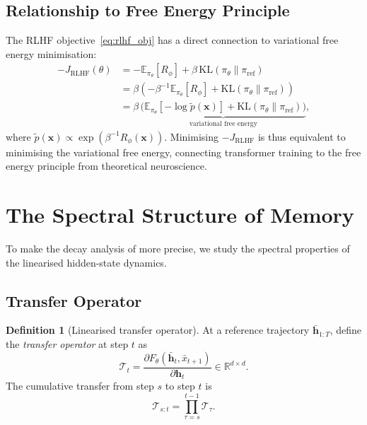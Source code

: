 \documentclass[11pt,a4paper]{article}
\theoremstyle{plain}
\theoremstyle{definition}
\newtheorem{definition}[theorem]{Definition}
\theoremstyle{remark}
\newcommand{\R}{\mathbb{R}}
\newcommand{\E}{\mathbb{E}}
\newcommand{\cT}{\mathcal{T}}
\newcommand{\KL}{\mathrm{KL}}
\begin{document}
\subsection{Relationship to Free Energy Principle}

The RLHF objective~\eqref{eq:rlhf_obj} has a direct connection to variational
free energy minimisation:
\begin{align}
  -J_{\mathrm{RLHF}}(\theta)
  &= -\E_{\pi_\theta}[R_\phi] + \beta\, \KL(\pi_\theta \| \pi_{\mathrm{ref}}) \\
  &= \beta\!\left(
       -\beta^{-1}\E_{\pi_\theta}[R_\phi]
       + \KL(\pi_\theta \| \pi_{\mathrm{ref}})
     \right) \\
  &= \beta\, \underbrace{\bigl(
       \E_{\pi_\theta}[-\log \tilde{p}(\bm{x})]
       + \KL(\pi_\theta \| \pi_{\mathrm{ref}})
     \bigr)}_{\text{variational free energy}},
\end{align}
where $\tilde{p}(\bm{x}) \propto \exp(\beta^{-1} R_\phi(\bm{x}))$. Minimising
$-J_{\mathrm{RLHF}}$ is thus equivalent to minimising the variational free
energy, connecting transformer training to the free energy principle from
theoretical neuroscience.


\section{The Spectral Structure of Memory}\label{sec:spectral}

To make the decay analysis of  more precise, we study the
spectral properties of the linearised hidden-state dynamics.

\subsection{Transfer Operator}

\begin{definition}[Linearised transfer operator]
At a reference trajectory $\bar{\bm{h}}_{1:T}$, define the \emph{transfer
operator} at step $t$ as
\[
  \cT_t = \frac{\partial F_\theta(\bar{\bm{h}}_t, \bar{x}_{t+1})}%
               {\partial \bm{h}_t}
  \in \R^{d \times d}.
\]
The cumulative transfer from step $s$ to step $t$ is
\[
  \cT_{s:t} = \prod_{\tau=s}^{t-1} \cT_\tau.
\]
\end{definition}
\end{document}
